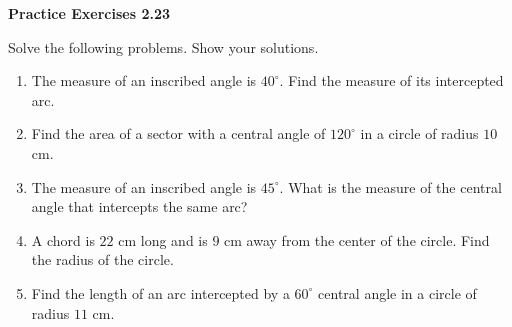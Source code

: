 \vspace{0.3ex}
\noindent\textbf{Practice Exercises 2.23}

\vspace{0.2ex}

Solve the following problems. Show your solutions.

\begin{enumerate}
    \item The measure of an inscribed angle is $40^\circ$. Find the measure of its intercepted arc.
    \item Find the area of a sector with a central angle of $120^\circ$ in a circle of radius $10$ cm.
    \item The measure of an inscribed angle is $45^\circ$. What is the measure of the central angle that intercepts the same arc?
    \item A chord is $22$ cm long and is $9$ cm away from the center of the circle. Find the radius of the circle.
    \item Find the length of an arc intercepted by a $60^\circ$ central angle in a circle of radius $11$ cm.
\end{enumerate}
